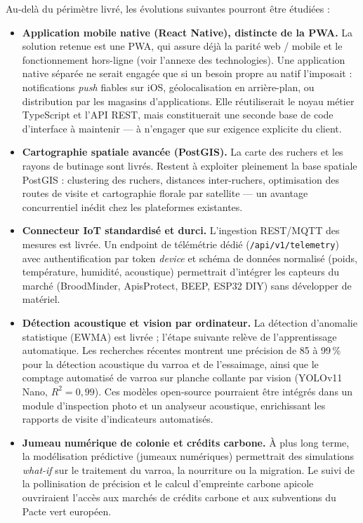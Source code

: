 Au-delà du périmètre livré, les évolutions suivantes pourront être étudiées :
\begin{itemize}
  \item \textbf{Application mobile native (React Native), distincte de la PWA.}
  La solution retenue est une PWA, qui assure déjà la parité web / mobile et le
  fonctionnement hors-ligne (voir l'annexe des technologies). Une application
  native séparée ne serait engagée que si un besoin propre au natif l'imposait :
  notifications \emph{push} fiables sur iOS, géolocalisation en arrière-plan, ou
  distribution par les magasins d'applications. Elle réutiliserait le noyau métier
  TypeScript et l'API REST, mais constituerait une seconde base de code d'interface
  à maintenir --- à n'engager que sur exigence explicite du client.

  \item \textbf{Cartographie spatiale avancée (PostGIS).}
  La carte des ruchers et les rayons de butinage sont livrés. Restent à exploiter
  pleinement la base spatiale PostGIS : clustering des ruchers, distances
  inter-ruchers, optimisation des routes de visite et cartographie florale par
  satellite --- un avantage concurrentiel inédit chez les plateformes existantes.

  \item \textbf{Connecteur IoT standardisé et durci.}
  L'ingestion REST/MQTT des mesures est livrée. Un endpoint de télémétrie dédié
  (\texttt{/api/v1/telemetry}) avec authentification par token \emph{device} et
  schéma de données normalisé (poids, température, humidité, acoustique) permettrait
  d'intégrer les capteurs du marché (BroodMinder, ApisProtect, BEEP, ESP32 DIY)
  sans développer de matériel.

  \item \textbf{Détection acoustique et vision par ordinateur.}
  La détection d'anomalie statistique (EWMA) est livrée ; l'étape suivante relève de
  l'apprentissage automatique. Les recherches récentes montrent une précision de 85 à
  99\,\% pour la détection acoustique du varroa et de l'essaimage, ainsi que le
  comptage automatisé de varroa sur planche collante par vision (YOLOv11 Nano,
  $R^2 = 0{,}99$). Ces modèles open-source pourraient être intégrés dans un module
  d'inspection photo et un analyseur acoustique, enrichissant les rapports de visite
  d'indicateurs automatisés.

  \item \textbf{Jumeau numérique de colonie et crédits carbone.}
  À plus long terme, la modélisation prédictive (jumeaux numériques) permettrait des
  simulations \emph{what-if} sur le traitement du varroa, la nourriture ou la
  migration. Le suivi de la pollinisation de précision et le calcul d'empreinte
  carbone apicole ouvriraient l'accès aux marchés de crédits carbone et aux
  subventions du Pacte vert européen.
\end{itemize}

